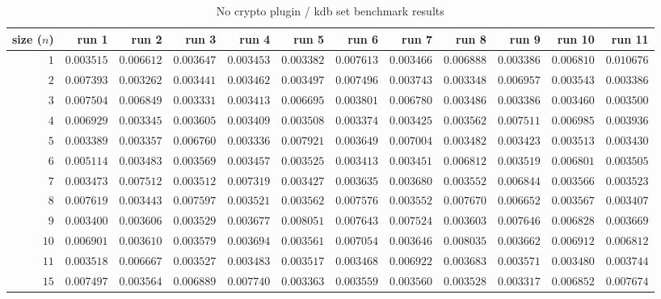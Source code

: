  
\begin{sidewaystable} \centering \caption{No crypto plugin / kdb set benchmark results} \label{eval-table-no-crypto-set} \scriptsize \begin{tabular}{r|rrrrrrrrrrr} size ($n$) & run 1 & run 2 & run 3 & run 4 & run 5 & run 6 & run 7 & run 8 & run 9 & run 10 & run 11\\ \hline
$1$ & $0.003515$ & $0.006612$ & $0.003647$ & $0.003453$ & $0.003382$ & $0.007613$ & $0.003466$ & $0.006888$ & $0.003386$ & $0.006810$ & $0.010676$ \\
$2$ & $0.007393$ & $0.003262$ & $0.003441$ & $0.003462$ & $0.003497$ & $0.007496$ & $0.003743$ & $0.003348$ & $0.006957$ & $0.003543$ & $0.003386$ \\
$3$ & $0.007504$ & $0.006849$ & $0.003331$ & $0.003413$ & $0.006695$ & $0.003801$ & $0.006780$ & $0.003486$ & $0.003386$ & $0.003460$ & $0.003500$ \\
$4$ & $0.006929$ & $0.003345$ & $0.003605$ & $0.003409$ & $0.003508$ & $0.003374$ & $0.003425$ & $0.003562$ & $0.007511$ & $0.006985$ & $0.003936$ \\
$5$ & $0.003389$ & $0.003357$ & $0.006760$ & $0.003336$ & $0.007921$ & $0.003649$ & $0.007004$ & $0.003482$ & $0.003423$ & $0.003513$ & $0.003430$ \\
$6$ & $0.005114$ & $0.003483$ & $0.003569$ & $0.003457$ & $0.003525$ & $0.003413$ & $0.003451$ & $0.006812$ & $0.003519$ & $0.006801$ & $0.003505$ \\
$7$ & $0.003473$ & $0.007512$ & $0.003512$ & $0.007319$ & $0.003427$ & $0.003635$ & $0.003680$ & $0.003552$ & $0.006844$ & $0.003566$ & $0.003523$ \\
$8$ & $0.007619$ & $0.003443$ & $0.007597$ & $0.003521$ & $0.003562$ & $0.007576$ & $0.003552$ & $0.007670$ & $0.006652$ & $0.003567$ & $0.003407$ \\
$9$ & $0.003400$ & $0.003606$ & $0.003529$ & $0.003677$ & $0.008051$ & $0.007643$ & $0.007524$ & $0.003603$ & $0.007646$ & $0.006828$ & $0.003669$ \\
$10$ & $0.006901$ & $0.003610$ & $0.003579$ & $0.003694$ & $0.003561$ & $0.007054$ & $0.003646$ & $0.008035$ & $0.003662$ & $0.006912$ & $0.006812$ \\
$11$ & $0.003518$ & $0.006667$ & $0.003527$ & $0.003483$ & $0.003517$ & $0.003468$ & $0.006922$ & $0.003683$ & $0.003571$ & $0.003480$ & $0.003744$ \\
$15$ & $0.007497$ & $0.003564$ & $0.006889$ & $0.007740$ & $0.003363$ & $0.003559$ & $0.003560$ & $0.003528$ & $0.003317$ & $0.006852$ & $0.007674$ \\

\end{tabular}
\end{sidewaystable}
